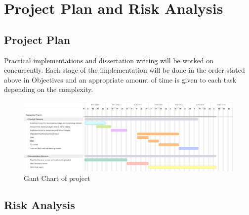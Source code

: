 \documentclass[12pt,runningheads]{llncs}
\begin{document}
\section{Project Plan and Risk Analysis}

\subsection{Project Plan}

Practical implementations and dissertation writing will be worked on
concurrently. Each stage of the implementation will be done in the order stated
above in Objectives and an appropriate amount of time is given to each task
depending on the complexity.

\begin{figure}
    \centering
    \caption{Gant Chart of project}\label{tab1}
    \includegraphics[width=\textwidth,scale=1.5]{GantChart.png}
\end{figure}

\newpage

\subsection{Risk Analysis}
\end{document}
